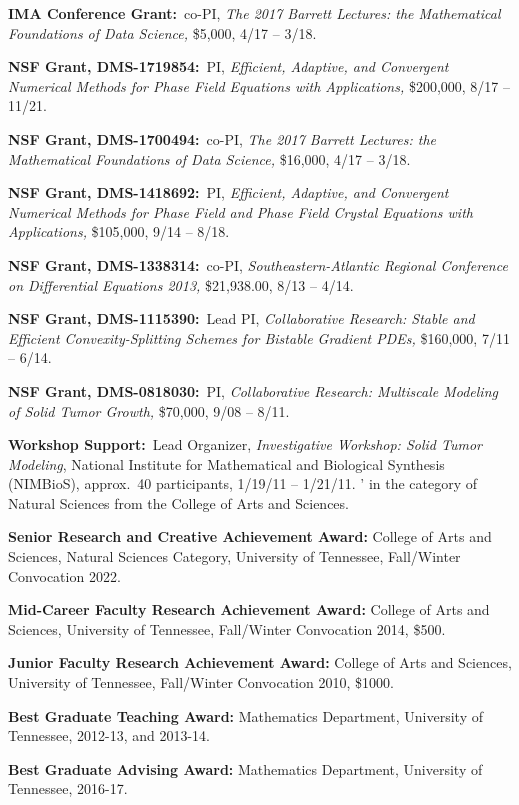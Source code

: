 \documentclass[11pt]{letter}
\begin{document}
\begin{description}
    \item
\textbf{IMA Conference Grant:}~co-PI, {\sl The 2017 Barrett Lectures: the Mathematical Foundations of Data Science,} \$5,000, 4/17 -- 3/18.


    \item
\textbf{NSF Grant, DMS-1719854:}~PI, {\sl Efficient, Adaptive, and Convergent Numerical Methods for Phase Field Equations with Applications,} \$200,000, 8/17 -- 11/21.


	 \item
\textbf{NSF Grant, DMS-1700494:}~co-PI, {\sl The 2017 Barrett Lectures: the Mathematical Foundations of Data Science,} \$16,000, 4/17 -- 3/18.

    \item
\textbf{NSF Grant, DMS-1418692:}~PI, {\sl Efficient, Adaptive, and Convergent Numerical Methods for Phase Field and Phase Field Crystal Equations with Applications,} \$105,000, 9/14 -- 8/18.

    \item
\textbf{NSF Grant, DMS-1338314:}~co-PI, {\sl Southeastern-Atlantic Regional Conference on Differential Equations 2013,} \$21,938.00, 8/13 -- 4/14.

    \item
\textbf{NSF Grant, DMS-1115390:}~Lead PI, {\sl Collaborative Research: Stable and Efficient Convexity-Splitting Schemes for Bistable Gradient PDEs,} \$160,000, 7/11 -- 6/14.

    \item
\textbf{NSF Grant, DMS-0818030:}~PI, {\sl Collaborative Research: Multiscale Modeling of Solid Tumor Growth,} \$70,000, 9/08 -- 8/11.
	
	\item
\textbf{Workshop Support:}~Lead Organizer, {\sl Investigative Workshop: Solid Tumor Modeling}, National Institute for Mathematical and Biological Synthesis (NIMBioS), approx.~40 participants, 1/19/11 -- 1/21/11.
	'
	 in the category of Natural Sciences from the College of Arts and Sciences.
	
	\item
\textbf{Senior Research and Creative Achievement Award:} College of Arts and Sciences, Natural Sciences Category, University of Tennessee, Fall/Winter Convocation 2022.
	
	\item
\textbf{Mid-Career Faculty Research Achievement Award:} College of Arts and Sciences, University of Tennessee, Fall/Winter Convocation 2014, \$500.
	\item
\textbf{Junior Faculty Research Achievement Award:} College of Arts and Sciences, University of Tennessee, Fall/Winter Convocation 2010, \$1000.
	\item
\textbf{Best Graduate Teaching Award:} Mathematics Department, University of Tennessee, 2012-13, and 2013-14.
	\item
\textbf{Best Graduate Advising Award:} Mathematics Department, University of Tennessee, 2016-17.

    \end{description}
	
\end{document}
